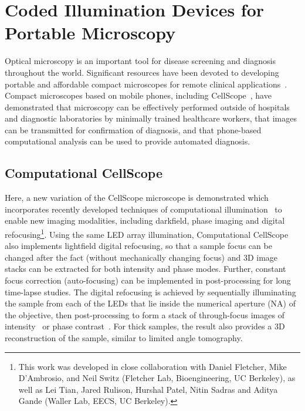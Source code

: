 \section{Coded Illumination Devices for Portable Microscopy}
Optical microscopy is an important tool for disease screening and diagnosis throughout the world. Significant resources have been devoted to developing portable and affordable compact microscopes for remote clinical applications~\cite{Zhu2011, switz2014low, smith2011cell, maamari2013mobile,C4LC00010B,Vashist2014, steenblik2005lenses, cybulski2014foldscope, boppart2014point, Greenbaum17122014, mudanyali2010compact, tseng2010lensfree}.
Compact microscopes based on mobile phones, including CellScope~\cite{breslauer2009mobile, skandarajah2014quantitative}, have demonstrated that microscopy can be effectively performed outside of hospitals and diagnostic laboratories by minimally trained healthcare workers, that images can be transmitted for confirmation of diagnosis, and that phone-based computational analysis can be used to provide automated diagnosis.

\subsection{Computational CellScope}\label{sec:fabrication:ccs}
Here, a new variation of the CellScope microscope is demonstrated which incorporates recently developed techniques of computational illumination~\cite{Zheng2011, Tian14, zijiMulti} to enable new imaging modalities, including darkfield, phase imaging and digital refocusing\footnote{This work was developed in close collaboration with Daniel Fletcher, Mike D'Ambrosio, and Neil Switz (Fletcher Lab, Bioengineering, UC Berkeley), as well as Lei Tian, Jared Rulison, Hurshal Patel, Nitin Sadras and Aditya Gande (Waller Lab, EECS, UC Berkeley).}. Using the same LED array illumination, Computational CellScope also implements lightfield digital refocusing, so that a sample focus can be changed after the fact (without mechanically changing focus) and 3D image stacks can be extracted for both intensity and phase modes. Further, constant focus correction (auto-focusing) can be implemented in post-processing for long time-lapse studies. The digital refocusing is achieved by sequentially illuminating the sample from each of the LEDs that lie inside the numerical aperture (NA) of the objective, then post-processing to form a stack of through-focus images of intensity~\cite{Ng2005,Zheng2011} or phase contrast~\cite{Tian14}. For thick samples, the result also provides a 3D reconstruction of the sample, similar to limited angle tomography.


